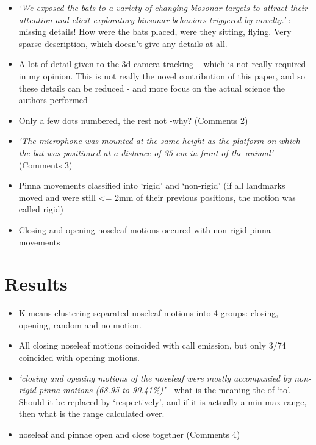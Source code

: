 \documentclass[
]{book}
\providecommand{\tightlist}{%
  \setlength{\itemsep}{0pt}\setlength{\parskip}{0pt}}
\begin{document}
\begin{itemize}
\item
  \emph{`We exposed the bats to a variety of changing biosonar targets to attract their attention and elicit exploratory biosonar behaviors triggered by novelty.'} : missing details! How were the bats placed, were they sitting, flying. Very sparse description, which doesn't give any details at all.
\item
  A lot of detail given to the 3d camera tracking -- which is not really required in my opinion. This is not really the novel contribution of this paper, and so these details can be reduced - and more focus on the actual science the authors performed
\item
  Only a few dots numbered, the rest not -why? (\protect\hypertarget{com_zhang}{}{Comments 2})
\item
  \emph{`The microphone was mounted at the same height as the platform on which the bat was positioned at a distance of 35 cm in front of the animal'} (\protect\hypertarget{com_zhang}{}{Comments 3})
\item
  Pinna movements classified into `rigid' and `non-rigid' (if all landmarks moved and were still \textless= 2mm of their previous positions, the motion was called rigid)
\item
  Closing and opening noseleaf motions occured with non-rigid pinna movements
\end{itemize}

\hypertarget{results}{%
\section{Results}\label{results}}

\begin{itemize}
\tightlist
\item
  K-means clustering separated noseleaf motions into 4 groups: closing, opening, random and no motion.
\item
  All closing noseleaf motions coincided with call emission, but only 3/74 coincided with opening motions.
\item
  \emph{`closing and opening motions of the noseleaf were mostly accompanied by non-rigid pinna motions (68.95 to 90.41\%)'} - what is the meaning the of `to'. Should it be replaced by `respectively', and if it is actually a min-max range, then what is the range calculated over.
\item
  noseleaf and pinnae open and close together (\protect\hypertarget{com_zhang}{}{Comments 4})
\end{itemize}
\end{document}
